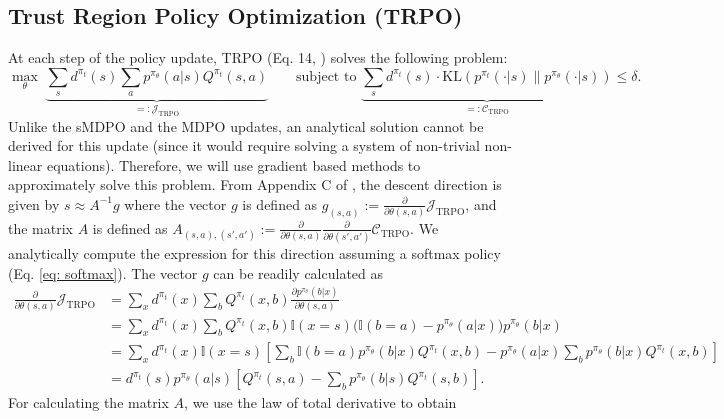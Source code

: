 \documentclass[a4paper, 10pt]{article}
\begin{document}
\subsection{Trust Region Policy Optimization (TRPO)}
At each step of the policy update, TRPO (Eq. 14, \citet{schulman2015trust}) solves the following problem:
\begin{equation}
  \max_\theta \; \underbrace{\sum_s d^{\pi_t}(s) \sum_a p^{\pi_\theta}(a | s) Q^{\pi_t}(s, a)}_{=: \mathcal{J}_{\text{TRPO}}} \qquad \text{subject to } \underbrace{\sum_s d^{\pi_t}(s) \cdot \text{KL}(p^{\pi_t}(\cdot | s) \| p^{\pi_\theta}(\cdot | s))}_{=: \mathcal{C}_{\text{TRPO}}} \leq \delta.  
\end{equation}
Unlike the sMDPO and the MDPO updates, an analytical solution cannot be derived for this update (since it would require solving a system of non-trivial non-linear equations). Therefore, we will use gradient based methods to approximately solve this problem. From Appendix C of \citet{schulman2015trust}, the descent direction is given by $s \approx A^{-1} g$ where the vector $g$ is defined as $g_{(s, a)} := \frac{\partial}{\partial \theta(s, a)} \mathcal{J}_{\text{TRPO}}$, and the matrix $A$ is defined as $A_{(s, a), (s', a')} := \frac{\partial}{\partial \theta(s, a)} \frac{\partial}{\partial \theta(s', a')} \mathcal{C}_{\text{TRPO}}$. We analytically compute the expression for this direction assuming a softmax policy (Eq. \ref{eq: softmax}). The vector $g$ can be readily calculated as
\begin{align}
  \frac{\partial}{\partial \theta(s, a)} \mathcal{J}_{\text{TRPO}} &= \sum_x d^{\pi_t}(x) \sum_b Q^{\pi_t}(x, b) \frac{\partial p^{\pi_\theta}(b | x)}{\partial \theta(s, a)} \nonumber \\
  &= \sum_x d^{\pi_t}(x) \sum_b Q^{\pi_t}(x, b) \mathbb{I}(x = s) \Big( \mathbb{I}(b = a) - p^{\pi_\theta}(a | x) \Big) p^{\pi_\theta}(b | x) \nonumber \\
  &= \sum_x d^{\pi_t}(x) \mathbb{I}(x = s) \left[ \sum_b \mathbb{I}(b = a) p^{\pi_\theta}(b | x) Q^{\pi_t}(x, b) - p^{\pi_\theta}(a | x) \sum_b p^{\pi_\theta}(b | x) Q^{\pi_t}(x, b) \right] \nonumber \\
  &= d^{\pi_t}(s) p^{\pi_\theta}(a | s) \left[ Q^{\pi_t}(s, a) - \sum_b p^{\pi_\theta}(b | s) Q^{\pi_t}(s, b) \right]. \label{eq: trpo_gradient}
\end{align}
For calculating the matrix $A$, we use the law of total derivative to obtain
\end{document}
